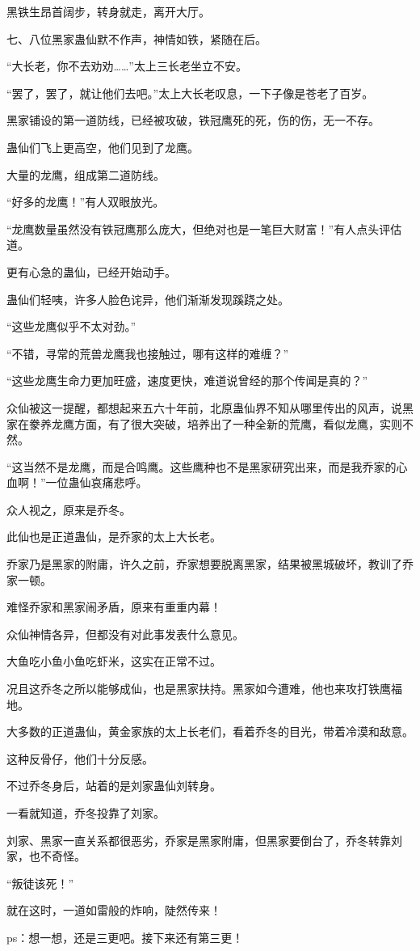 \begin{this_body}
黑铁生昂首阔步，转身就走，离开大厅。

七、八位黑家蛊仙默不作声，神情如铁，紧随在后。

“大长老，你不去劝劝……”太上三长老坐立不安。

“罢了，罢了，就让他们去吧。”太上大长老叹息，一下子像是苍老了百岁。

黑家铺设的第一道防线，已经被攻破，铁冠鹰死的死，伤的伤，无一不存。

蛊仙们飞上更高空，他们见到了龙鹰。

大量的龙鹰，组成第二道防线。

“好多的龙鹰！”有人双眼放光。

“龙鹰数量虽然没有铁冠鹰那么庞大，但绝对也是一笔巨大财富！”有人点头评估道。

更有心急的蛊仙，已经开始动手。

蛊仙们轻咦，许多人脸色诧异，他们渐渐发现蹊跷之处。

“这些龙鹰似乎不太对劲。”

“不错，寻常的荒兽龙鹰我也接触过，哪有这样的难缠？”

“这些龙鹰生命力更加旺盛，速度更快，难道说曾经的那个传闻是真的？”

众仙被这一提醒，都想起来五六十年前，北原蛊仙界不知从哪里传出的风声，说黑家在豢养龙鹰方面，有了很大突破，培养出了一种全新的荒鹰，看似龙鹰，实则不然。

“这当然不是龙鹰，而是合鸣鹰。这些鹰种也不是黑家研究出来，而是我乔家的心血啊！”一位蛊仙哀痛悲呼。

众人视之，原来是乔冬。

此仙也是正道蛊仙，是乔家的太上大长老。

乔家乃是黑家的附庸，许久之前，乔家想要脱离黑家，结果被黑城破坏，教训了乔家一顿。

难怪乔家和黑家闹矛盾，原来有重重内幕！

众仙神情各异，但都没有对此事发表什么意见。

大鱼吃小鱼小鱼吃虾米，这实在正常不过。

况且这乔冬之所以能够成仙，也是黑家扶持。黑家如今遭难，他也来攻打铁鹰福地。

大多数的正道蛊仙，黄金家族的太上长老们，看着乔冬的目光，带着冷漠和敌意。

这种反骨仔，他们十分反感。

不过乔冬身后，站着的是刘家蛊仙刘转身。

一看就知道，乔冬投靠了刘家。

刘家、黑家一直关系都很恶劣，乔家是黑家附庸，但黑家要倒台了，乔冬转靠刘家，也不奇怪。

“叛徒该死！”

就在这时，一道如雷般的炸响，陡然传来！

ps：想一想，还是三更吧。接下来还有第三更！

\end{this_body}

